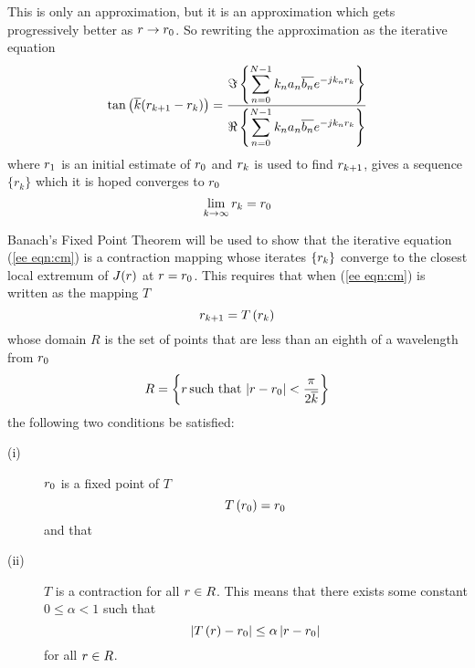 This is only an approximation, but it is an approximation which gets 
progressively better as ${r}\rightarrow {r}_0$.  So rewriting the
approximation as the iterative equation
\begin{equation}\label{ee eqn:cm soln}
\tan\left(\overline{k}({r}_{k+1}-{r}_k)\right)=
\frac{\displaystyle\Im\left\{\sum_{n=0}^{N-1} k_na_n\overline{b_n}{e^{-jk_n{r}_k}}\right\}}
{\displaystyle\Re\left\{\sum_{n=0}^{N-1} k_na_n\overline{b_n}{e^{-jk_n{r}_k}}\right\}}
\end{equation}
where ${r}_1$ is an initial estimate of ${r}_0$ and ${r}_k$ is used to find
${r}_{k+1}$, gives a sequence $\{r_k\}$ which it is hoped converges to ${r}_0$
\begin{equation}
\lim_{k\rightarrow\infty}{r}_k={r}_0
\end{equation}

\label{ee app:proof using cm}

Banach's Fixed Point Theorem will be used to show that the iterative 
equation (\ref{ee eqn:cm}) is a contraction mapping whose iterates $\{{r}_k\}$ 
converge to the closest local extremum of $J({r})$ at ${r}={r}_0$.
This requires that when (\ref{ee eqn:cm}) is written as the mapping $T$
\begin{equation}
{r}_{k+1}=T\left({r}_k\right)
\end{equation}
whose domain $R$ is the set of points that are less than an eighth of a
wavelength from ${r}_0$
\begin{equation}
R=\left\{
{r}\,\mbox{such that}\,\left|{r}-{r}_0\right|<\frac{\pi}{2\overline{k}}
\right\}
\end{equation}
the following two conditions be satisfied:
\begin{description}
\item[(i)]  ${r}_0$ is a fixed point of $T$
\begin{equation}
T\left({r}_0\right)={r}_0
\end{equation}
and that
\item[(ii)] $T$ is a contraction for all ${r}\in R$.  This means that
there exists some constant $0\leq\alpha<1$ such that
\begin{equation}
\left|T\left({r}\right)-{r}_0\right|\leq\alpha \left|{r}-{r}_0\right|
\end{equation}
for all ${r}\in R$.
\end{description}

